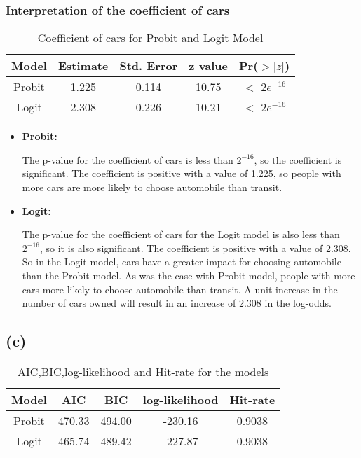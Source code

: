 \documentclass[a4paper]{article}
\begin{document}
\subsubsection*{Interpretation of the coefficient of cars}

\begin{table}[h!]
    \centering
    \begin{tabular}{|ccccc|}
        \hline
        \textbf{Model} & \textbf{Estimate} & \textbf{Std. Error} & \textbf{z value}& \textbf{Pr($>|z|$)} \\ \hline
        Probit & 1.225 & 0.114 & 10.75 & $<$ $2e^{-16}$ \\
        Logit & 2.308 & 0.226 & 10.21 & $<$ $2e^{-16}$ \\ \hline
    \end{tabular}
    \caption{Coefficient of cars for Probit and Logit Model}
    \label{tab:cars coeff}
\end{table}

\begin{itemize}
    \item \textbf{Probit:}
    
    The p-value for the coefficient of cars is less than $2^{-16}$, so the coefficient is significant. The coefficient is positive with a value of 1.225, so people with more cars are more likely to choose automobile than transit.

    \item \textbf{Logit:}
    
    The p-value for the coefficient of cars for the Logit model is also less than $2^{-16}$, so it is also significant. The coefficient is positive with a value of 2.308. So in the Logit model, cars have a greater impact for choosing automobile than the Probit model. As was the case with Probit model, people with more cars more likely to choose automobile than transit. A unit increase in the number of cars owned will result in an increase of 2.308 in the log-odds.
\end{itemize}


\subsection*{(c)}

\begin{table}[h!]
    \centering
    \begin{tabular}{|ccccc|}
        \hline
        \textbf{Model} & \textbf{AIC} & \textbf{BIC} & \textbf{log-likelihood}& \textbf{Hit-rate} \\ \hline
        Probit & 470.33 & 494.00 & -230.16 & 0.9038 \\
        Logit & 465.74 & 489.42 & -227.87 & 0.9038 \\ \hline
    \end{tabular}
    \caption{AIC,BIC,log-likelihood and Hit-rate for the models}
    \label{tab:model metrics}
\end{table}
\end{document}
